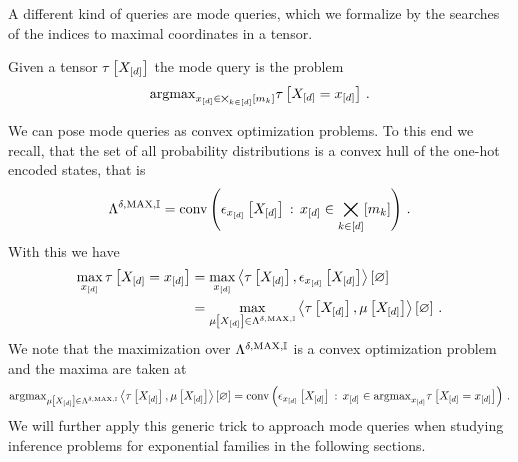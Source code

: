 \label{sec:modeQueries}

A different kind of queries are mode queries, which we formalize by the searches of the indices to maximal coordinates in a tensor.

\begin{definition}
    Given a tensor $\tau\left[X_{[d]}\right]$ the mode query is the problem
    \begin{align}
        \mathrm{argmax}_{x_{[d]}\in\bigtimes_{k\in[d]}[m_{k}]} \tau\left[X_{[d]}=x_{[d]}\right] \, .
    \end{align}
\end{definition}


We can pose mode queries as convex optimization problems.
To this end we recall, that the set of all probability distributions is a convex hull of the one-hot encoded states, that is
\begin{align*}
    \Lambda^{\delta,\mathrm{MAX},\mathbb{I}}
    = \mathrm{conv}\left(\epsilon_{x_{[d]}}\left[X_{[d]}\right] \, : \, x_{[d]}\in\bigtimes_{k\in[d]}[m_{k}]\right) \, .
\end{align*}
With this we have
\begin{align*}
    \max_{x_{[d]}} \tau\left[X_{[d]}=x_{[d]}\right]
    &= \max_{x_{[d]}} \left\langle \tau\left[X_{[d]}\right],\epsilon_{x_{[d]}}\left[X_{[d]}\right]\right\rangle \left[ \varnothing \right] \\
    &= \max_{\mu\left[X_{[d]}\right]\in\Lambda^{\delta,\mathrm{MAX},\mathbb{I}}} \left\langle \tau\left[X_{[d]}\right],\mu\left[X_{[d]}\right]\right\rangle \left[ \varnothing \right] \, .
\end{align*}
We note that the maximization over $\Lambda^{\delta,\mathrm{MAX},\mathbb{I}}$ is a convex optimization problem and the maxima are taken at
\begin{align*}
    \mathrm{argmax}_{\mu\left[X_{[d]}\right]\in\Lambda^{\delta,\mathrm{MAX},\mathbb{I}}} \left\langle \tau\left[X_{[d]}\right],\mu\left[X_{[d]}\right]\right\rangle \left[ \varnothing \right]
    = \mathrm{conv}\left(\epsilon_{x_{[d]}}\left[X_{[d]}\right] \, : \, x_{[d]}\in\mathrm{argmax}_{x_{[d]}} \tau\left[X_{[d]}=x_{[d]}\right]\right) \, .
\end{align*}
We will further apply this generic trick to approach mode queries when studying inference problems for exponential families in the following sections.

